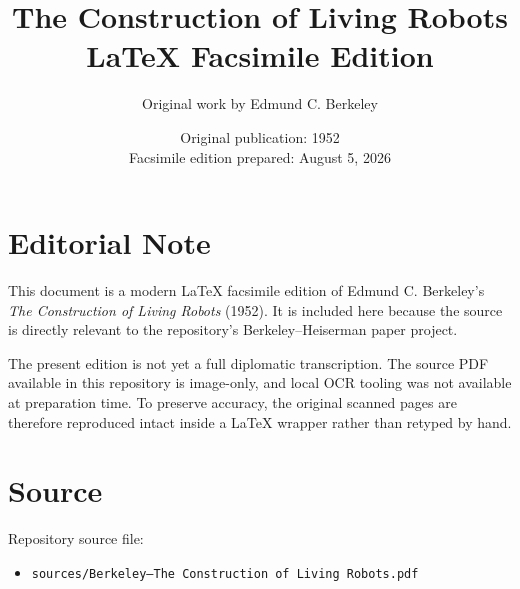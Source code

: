 \documentclass[11pt]{article}
\title{The Construction of Living Robots\\\large LaTeX Facsimile Edition}
\author{Original work by Edmund C. Berkeley}
\date{Original publication: 1952\\Facsimile edition prepared: August 5, 2026}
\begin{document}
\maketitle

\section*{Editorial Note}

This document is a modern LaTeX facsimile edition of Edmund C. Berkeley's
\emph{The Construction of Living Robots} (1952). It is included here because
the source is directly relevant to the repository's Berkeley--Heiserman paper
project.

The present edition is not yet a full diplomatic transcription. The source PDF
available in this repository is image-only, and local OCR tooling was not
available at preparation time. To preserve accuracy, the original scanned pages
are therefore reproduced intact inside a LaTeX wrapper rather than retyped by
hand.

\section*{Source}

Repository source file:

\begin{itemize}
\item \texttt{sources/Berkeley--The Construction of Living Robots.pdf}
\end{itemize}

\clearpage


\end{document}
